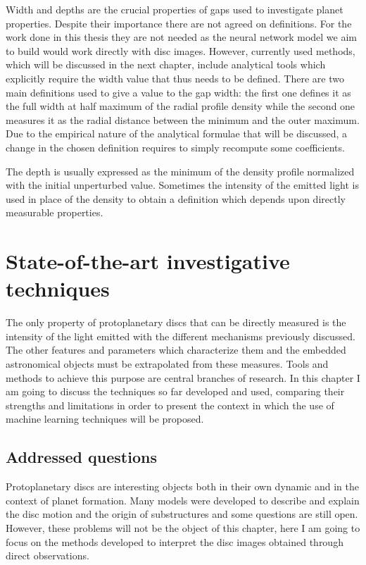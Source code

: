 \documentclass[a4paper,10pt]{report}
\begin{document}
Width and depths are the crucial properties of gaps used to investigate planet properties. Despite their importance there are not agreed on definitions.
For the work done in this thesis they are not needed as the neural network model we aim to build would work directly with disc images.
However, currently used methods, which will be discussed in the next chapter, include analytical tools which explicitly require the width
value that thus needs to be defined.
There are two main definitions used to give a value to the gap width: the first one defines it as the full width at half maximum of the radial profile density while
the second one measures it as the radial distance between the minimum and the outer maximum.
Due to the empirical nature of the analytical formulae that will be discussed, a change in the chosen definition requires to simply recompute
some coefficients.                                        

The depth is usually expressed as the minimum of the density profile normalized with the initial unperturbed value. Sometimes the intensity of the emitted light is used in place of the
density to obtain a definition which depends upon directly measurable properties.

\chapter{State-of-the-art investigative techniques}

The only property of protoplanetary discs that can be directly measured
is the intensity of the light emitted with the different mechanisms previously discussed.
The other features and parameters which characterize them and the embedded astronomical objects
must be extrapolated from these measures. 
Tools and methods to achieve this purpose are central branches of research. In this chapter I am going to discuss
the techniques so far developed and used, comparing their strengths and limitations in order to present the context
in which the use of machine learning techniques will be proposed.

\section{Addressed questions}

Protoplanetary discs are interesting objects both in their own dynamic and
in the context of planet formation.
Many models were developed to describe and explain the disc motion and the origin of substructures and
some questions are still open. However, these problems will not be the object of this chapter, 
here I am going to focus on the methods developed to interpret the
disc images obtained through direct observations.
\end{document}
